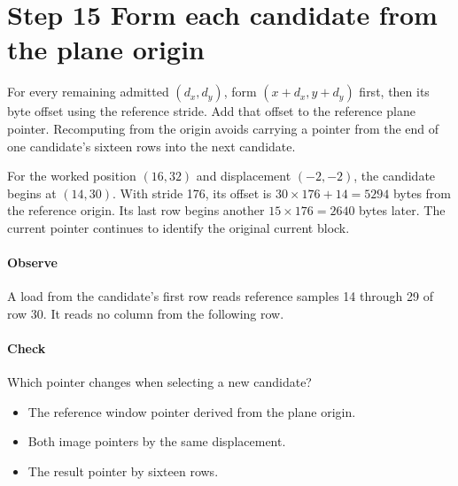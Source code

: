 \section{Step 15 Form each candidate from the plane origin}\label{h263-motion-s05}
For every remaining admitted $(d_x,d_y)$, form $(x+d_x,y+d_y)$ first, then its
byte offset using the reference stride. Add that offset to the reference plane
pointer. Recomputing from the origin avoids carrying a pointer from the end of
one candidate's sixteen rows into the next candidate.

For the worked position $(16,32)$ and displacement $(-2,-2)$, the candidate begins
at $(14,30)$. With stride 176, its offset is $30\times176+14=5294$ bytes from the
reference origin. Its last row begins another $15\times176=2640$ bytes later.
The current pointer continues to identify the original current block.

\paragraph{Observe} A load from the candidate's first row reads reference
samples 14 through 29 of row 30. It reads no column from the following row.
\paragraph{Check} Which pointer changes when selecting a new candidate?
\begin{itemize}
  \item[A.] The reference window pointer derived from the plane origin.
  \item[B.] Both image pointers by the same displacement.
  \item[C.] The result pointer by sixteen rows.
\end{itemize}
